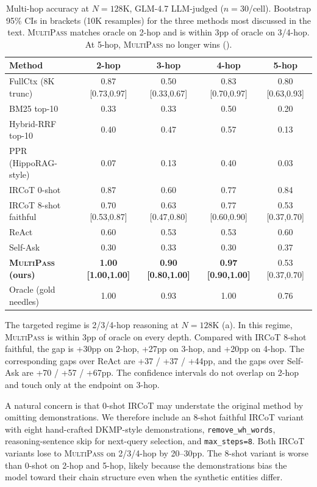 \documentclass{article}
\theoremstyle{plain}
\theoremstyle{definition}
\newcommand{\ours}{\textsc{MultiPass}}
\begin{document}
\begin{table}[t]
\centering
\caption{Multi-hop accuracy at $N{=}128$K, GLM-4.7 LLM-judged
($n{=}30$/cell). Bootstrap 95\% CIs in brackets (10K resamples) for the
three methods most discussed in the text. \ours{} matches oracle on 2-hop
and is within 3pp of oracle on 3/4-hop. At 5-hop, \ours{} no longer wins
().}
\label{tab:main}
\small
\begin{tabular}{@{}lcccc@{}}
\toprule
Method & 2-hop & 3-hop & 4-hop & 5-hop \\
\midrule
FullCtx (8K trunc) & 0.87 [0.73,0.97] & 0.50 [0.33,0.67] & 0.83 [0.70,0.97] & 0.80 [0.63,0.93] \\
BM25 top-10 & 0.33 & 0.33 & 0.50 & 0.20 \\
Hybrid-RRF top-10 & 0.40 & 0.47 & 0.57 & 0.13 \\
PPR (HippoRAG-style) & 0.07 & 0.13 & 0.40 & 0.03 \\
IRCoT 0-shot & 0.87 & 0.60 & 0.77 & 0.84 \\
IRCoT 8-shot faithful & 0.70 [0.53,0.87] & 0.63 [0.47,0.80] & 0.77 [0.60,0.90] & 0.53 [0.37,0.70] \\
ReAct & 0.60 & 0.53 & 0.53 & 0.60 \\
Self-Ask & 0.30 & 0.33 & 0.30 & 0.37 \\
\textbf{\ours{} (ours)} & \textbf{1.00 [1.00,1.00]} & \textbf{0.90 [0.80,1.00]} & \textbf{0.97 [0.90,1.00]} & 0.53 [0.37,0.70] \\
\midrule
Oracle (gold needles) & 1.00 & 0.93 & 1.00 & 0.76 \\
\bottomrule
\end{tabular}
\end{table}

The targeted regime is 2/3/4-hop reasoning at $N{=}128$K
(a). In this regime, \ours{} is within 3pp of
oracle on every depth. Compared with IRCoT 8-shot
faithful, the gap is +30pp on 2-hop, +27pp on 3-hop, and +20pp on 4-hop.
The corresponding gaps over ReAct are +37 / +37 / +44pp, and the gaps over
Self-Ask are +70 / +57 / +67pp. The confidence intervals do not overlap on
2-hop and touch only at the endpoint on 3-hop.

A natural concern is that 0-shot IRCoT may understate the original method
by omitting demonstrations. We therefore include an 8-shot faithful IRCoT
variant with eight hand-crafted DKMP-style demonstrations,
\texttt{remove\_wh\_words}, reasoning-sentence skip for next-query
selection, and \texttt{max\_steps=8}. Both IRCoT variants lose to \ours{}
on 2/3/4-hop by 20--30pp. The 8-shot variant is worse than 0-shot on
2-hop and 5-hop, likely because the demonstrations bias the model toward
their chain structure even when the synthetic entities differ.
\end{document}
